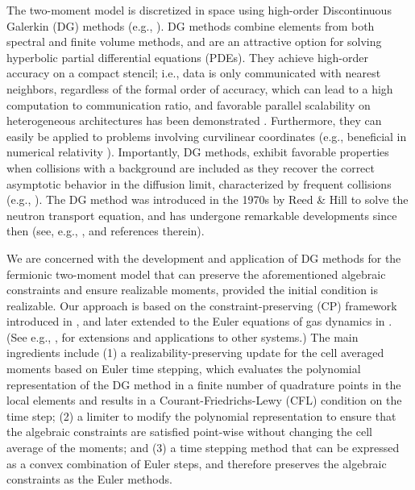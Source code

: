 The two-moment model is discretized in space using high-order Discontinuous Galerkin (DG) methods (e.g., \cite{cockburnShu_2001,hesthavenWarburton_2008}).  
DG methods combine elements from both spectral and finite volume methods, and are an attractive option for solving hyperbolic partial differential equations (PDEs).  
They achieve high-order accuracy on a compact stencil; i.e., data is only communicated with nearest neighbors, regardless of the formal order of accuracy, which can lead to a high computation to communication ratio, and favorable parallel scalability on heterogeneous architectures has been demonstrated \cite{klockner_etal_2009}.  
Furthermore, they can easily be applied to problems involving curvilinear coordinates (e.g., beneficial in numerical relativity \cite{teukolsky_2016}).  
Importantly, DG methods, exhibit favorable properties when collisions with a background are included as they recover the correct asymptotic behavior in the diffusion limit, characterized by frequent collisions (e.g., \cite{larsenMorel_1989,adams_2001,guermondKanschat_2010}).  
The DG method was introduced in the 1970s by Reed \& Hill \cite{reedHill_1973} to solve the neutron transport equation, and has undergone remarkable developments since then (see, e.g., \cite{shu_2016}, and references therein).  

We are concerned with the development and application of DG methods for the fermionic two-moment model that can preserve the aforementioned algebraic constraints and ensure realizable moments, provided the initial condition is realizable.  
Our approach is based on the constraint-preserving (CP) framework introduced in \cite{zhangShu_2010a}, and later extended to the Euler equations of gas dynamics in \cite{zhangShu_2010b}.  
(See e.g., \cite{xing_etal_2010,zhangShu_2011,olbrant_etal_2012,cheng_etal_2013,zhang_etal_2013,endeve_etal_2015,wuTang_2015}, for extensions and applications to other systems.)  
The main ingredients include (1) a realizability-preserving update for the cell averaged moments based on Euler time stepping, which evaluates the polynomial representation of the DG method in a finite number of quadrature points in the local elements and results in a Courant-Friedrichs-Lewy (CFL) condition on the time step; (2) a limiter to modify the polynomial representation to ensure that the algebraic constraints are satisfied point-wise without changing the cell average of the moments; and (3) a time stepping method that can be expressed as a convex combination of Euler steps, and therefore preserves the algebraic constraints as the Euler methods.  

